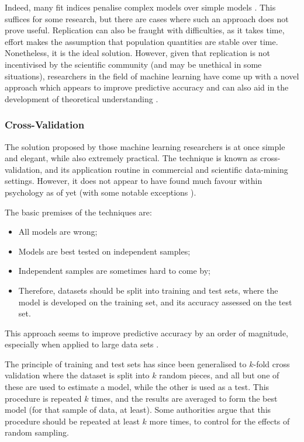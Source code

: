 Indeed, many fit indices penalise complex models over simple models . This suffices for some research, but there are cases where such an approach does not prove useful. Replication can also be fraught with difficulties, as it takes time, effort makes the assumption that population quantities are stable over time. Nonetheless, it is the ideal solution. However, given that replication is not incentivised by the scientific community (and may be unethical in some situations), researchers in the field of machine learning have come up with a novel approach which appears to improve predictive accuracy and can also aid in the development of theoretical understanding \cite{friedman2009elements}.

\subsubsection{Cross-Validation}

The solution proposed by those machine learning researchers is at once simple and elegant, while also extremely practical. The technique is known as cross-validation, and its application routine in commercial and scientific data-mining settings. However, it does not appear to have found much favour within psychology as of yet (with some notable exceptions \cite{dawes1979robust}).

The basic premises of the techniques are:
\begin{itemize}
\item All models are wrong;
\item Models are best tested on independent samples;
\item Independent samples are sometimes hard to come by;
\item Therefore, datasets should be split into training and test sets, where the model is developed on the training set, and its accuracy assessed on the test set.
\end{itemize}

This approach seems to improve predictive accuracy by an order of magnitude, especially when applied to large data sets \cite{breiman2001statistical}.  

The principle of training and test sets has since been generalised to $k$-fold cross validation where the dataset is split into $k$ random pieces, and all but one of these are used to estimate a model, while the other is used as a test. This procedure is repeated $k$ times, and the results are averaged to form the best model (for that sample of data, at least). Some authorities argue that this procedure should be repeated at least $k$ more times, to control for the effects of random sampling\cite{friedman2009elements}.

